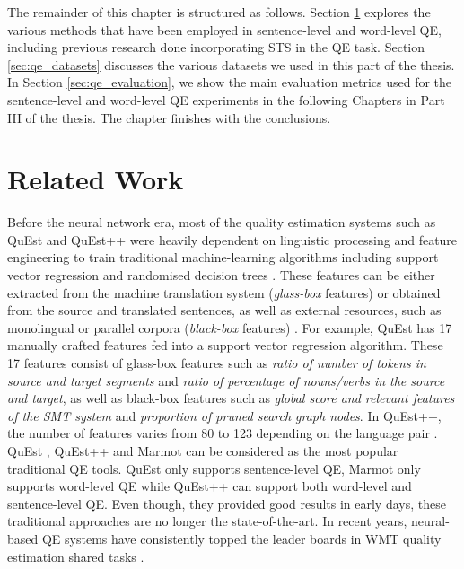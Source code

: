 The remainder of this chapter is structured as follows. Section \ref{sec:qe_related} explores the various methods that have been employed in sentence-level and word-level QE, including previous research done incorporating STS in the QE task. Section \ref{sec:qe_datasets} discusses the various datasets we used in this part of the thesis. In Section \ref{sec:qe_evaluation}, we show the main evaluation metrics used for the sentence-level and word-level QE experiments in the following Chapters in Part III of the thesis. The chapter finishes with the conclusions.



\section{Related Work}
\label{sec:qe_related}
Before the neural network era, most of the quality estimation systems such as QuEst \autocite{specia-etal-2013-quest} and QuEst++ \autocite{specia-etal-2015-multi} were heavily dependent on linguistic processing and feature engineering to train traditional machine-learning algorithms including support vector regression and randomised decision trees \autocite{specia-etal-2013-quest}. These features can be either extracted from the machine translation system (\textit{glass-box} features) or obtained from
the source and translated sentences, as well as external resources, such as monolingual or parallel corpora (\textit{black-box} features) \autocite{specia-etal-2009-estimating}. For example, QuEst \autocite{specia-etal-2013-quest} has 17 manually crafted features fed into a support vector regression algorithm. These 17 features consist of glass-box features such as \textit{ratio of number of tokens in source and target segments} and \textit{ratio of percentage of nouns/verbs in the source and target}, as well as black-box features such as \textit{global score and relevant features of the SMT system} and \textit{proportion of pruned search graph nodes}. In QuEst++, the number of features varies from 80 to 123 depending on the language pair \autocite{specia-etal-2015-multi}. QuEst \autocite{specia-etal-2013-quest}, QuEst++ \autocite{specia-etal-2015-multi} and Marmot \autocite{logacheva-etal-2016-marmot} can be considered as the most popular traditional QE tools. QuEst \autocite{specia-etal-2013-quest} only supports sentence-level QE, Marmot \autocite{logacheva-etal-2016-marmot} only supports word-level QE while QuEst++ \autocite{specia-etal-2015-multi} can support both word-level and sentence-level QE. Even though, they provided good results in early days, these traditional approaches are no longer the state-of-the-art. In recent years, neural-based QE systems have consistently topped the leader boards in WMT quality estimation shared tasks  \autocite{kepler-etal-2019-openkiwi}.  

